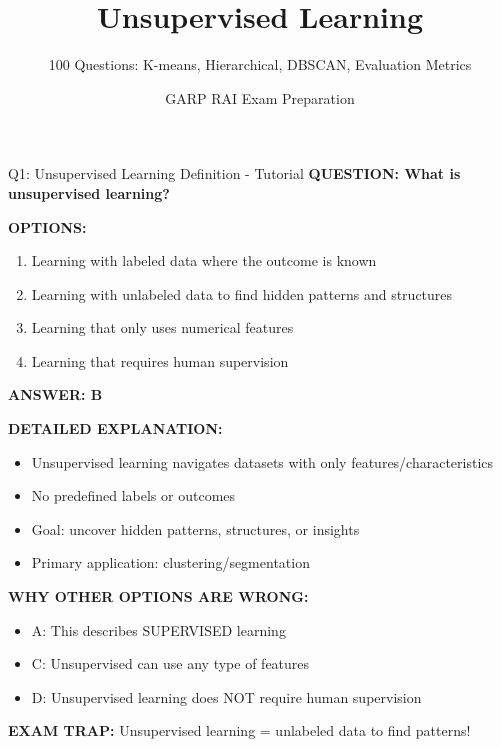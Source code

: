 \documentclass[8pt]{beamer}
\title{Unsupervised Learning}
\subtitle{100 Questions: K-means, Hierarchical, DBSCAN, Evaluation Metrics}
\author{GARP RAI Exam Preparation}
\date{}
\begin{document}
	
	\begin{frame}
		\titlepage
	\end{frame}
	
	
	\begin{frame}{Q1: Unsupervised Learning Definition - Tutorial}
		\fontsize{6.5}{7.5}\selectfont
		\textbf{QUESTION: What is unsupervised learning?}
		
		\vspace{0.1cm}
		\textbf{OPTIONS:}
		\begin{enumerate}
			\item Learning with labeled data where the outcome is known
			\item Learning with unlabeled data to find hidden patterns and structures
			\item Learning that only uses numerical features
			\item Learning that requires human supervision
		\end{enumerate}
		
		\vspace{0.1cm}
		\textcolor{myblue}{\textbf{ANSWER: B}}
		
		\vspace{0.1cm}
		\textbf{DETAILED EXPLANATION:}
		\begin{itemize}
			\item Unsupervised learning navigates datasets with only features/characteristics
			\item No predefined labels or outcomes
			\item Goal: uncover hidden patterns, structures, or insights
			\item Primary application: clustering/segmentation
		\end{itemize}
		
		\vspace{0.1cm}
		\textcolor{myred}{\textbf{WHY OTHER OPTIONS ARE WRONG:}}
		\begin{itemize}
			\item \textcolor{myred}{A:} This describes SUPERVISED learning
			\item \textcolor{myred}{C:} Unsupervised can use any type of features
			\item \textcolor{myred}{D:} Unsupervised learning does NOT require human supervision
		\end{itemize}
		
		\textcolor{myred}{\textbf{EXAM TRAP:}} Unsupervised learning = \textcolor{myblue}{unlabeled data to find patterns}!
	\end{frame}
	
\end{document}
